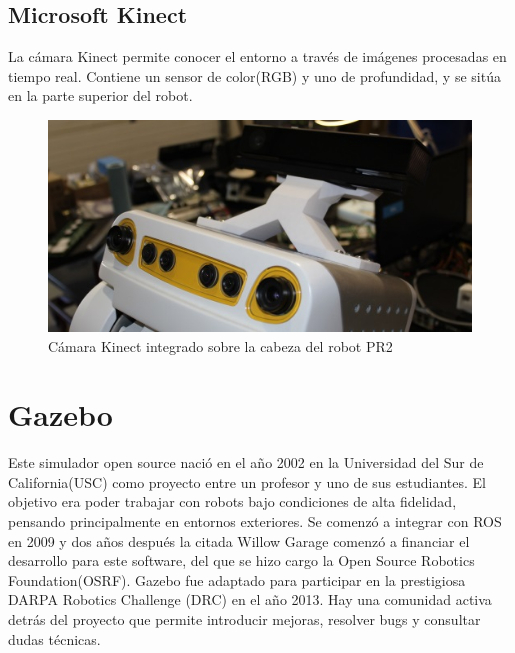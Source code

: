 \documentclass[12pt,spanish,chapterprefix, numbers=noenddot]{book}
\numberwithin{equation}{section}
\numberwithin{figure}{section}
\begin{document}
\subsection{Microsoft Kinect}
La cámara Kinect permite conocer el entorno a través de imágenes procesadas en tiempo real. 
Contiene un sensor de color(RGB) y uno de profundidad, y se sitúa en la parte superior del robot. 

\begin{figure}[hbt!]
\centering
\includegraphics[width=12cm]{Figs/kinect.jpg}
\par
\caption{\label{fig:kinect}Cámara Kinect integrado sobre la cabeza del robot PR2}
\end{figure}


\section{Gazebo}
Este simulador open source nació en el año 2002 en la Universidad del Sur de California(USC) como proyecto entre un profesor y uno de sus estudiantes. El objetivo era poder trabajar con robots bajo condiciones de alta fidelidad, pensando principalmente en entornos exteriores. Se comenzó a integrar con ROS en 2009 y dos años después la citada Willow Garage comenzó a financiar el desarrollo para este software, del que se hizo cargo la Open Source Robotics Foundation(OSRF).
Gazebo fue adaptado para participar en la prestigiosa DARPA Robotics Challenge (DRC) en el año 2013. Hay una comunidad activa detrás del proyecto que permite introducir mejoras, resolver bugs y consultar dudas técnicas.
\end{document}
